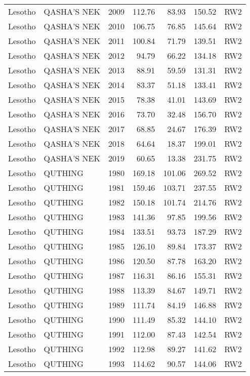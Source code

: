 \begin{longtable}{lllrrrl}
  Lesotho & QASHA'S NEK & 2009 & 112.76 & 83.93 & 150.52 & RW2 \\ 
  Lesotho & QASHA'S NEK & 2010 & 106.75 & 76.85 & 145.64 & RW2 \\ 
  Lesotho & QASHA'S NEK & 2011 & 100.84 & 71.79 & 139.51 & RW2 \\ 
  Lesotho & QASHA'S NEK & 2012 & 94.79 & 66.22 & 134.18 & RW2 \\ 
  Lesotho & QASHA'S NEK & 2013 & 88.91 & 59.59 & 131.31 & RW2 \\ 
  Lesotho & QASHA'S NEK & 2014 & 83.37 & 51.18 & 133.41 & RW2 \\ 
  Lesotho & QASHA'S NEK & 2015 & 78.38 & 41.01 & 143.69 & RW2 \\ 
  Lesotho & QASHA'S NEK & 2016 & 73.70 & 32.48 & 156.70 & RW2 \\ 
  Lesotho & QASHA'S NEK & 2017 & 68.85 & 24.67 & 176.39 & RW2 \\ 
  Lesotho & QASHA'S NEK & 2018 & 64.64 & 18.37 & 199.01 & RW2 \\ 
  Lesotho & QASHA'S NEK & 2019 & 60.65 & 13.38 & 231.75 & RW2 \\ 
  Lesotho & QUTHING & 1980 & 169.18 & 101.06 & 269.52 & RW2 \\ 
  Lesotho & QUTHING & 1981 & 159.46 & 103.71 & 237.55 & RW2 \\ 
  Lesotho & QUTHING & 1982 & 150.18 & 101.74 & 214.76 & RW2 \\ 
  Lesotho & QUTHING & 1983 & 141.36 & 97.85 & 199.56 & RW2 \\ 
  Lesotho & QUTHING & 1984 & 133.51 & 93.73 & 187.29 & RW2 \\ 
  Lesotho & QUTHING & 1985 & 126.10 & 89.84 & 173.37 & RW2 \\ 
  Lesotho & QUTHING & 1986 & 120.50 & 87.78 & 163.20 & RW2 \\ 
  Lesotho & QUTHING & 1987 & 116.31 & 86.16 & 155.31 & RW2 \\ 
  Lesotho & QUTHING & 1988 & 113.39 & 84.67 & 149.71 & RW2 \\ 
  Lesotho & QUTHING & 1989 & 111.74 & 84.19 & 146.88 & RW2 \\ 
  Lesotho & QUTHING & 1990 & 111.49 & 85.32 & 144.10 & RW2 \\ 
  Lesotho & QUTHING & 1991 & 112.00 & 87.43 & 142.54 & RW2 \\ 
  Lesotho & QUTHING & 1992 & 112.98 & 89.27 & 141.62 & RW2 \\ 
  Lesotho & QUTHING & 1993 & 114.62 & 90.57 & 144.06 & RW2 \\ 

\end{longtable}
